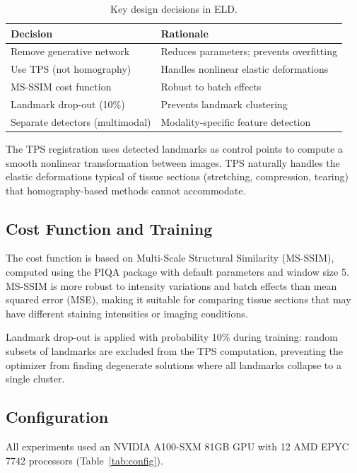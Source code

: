 \documentclass[11pt]{article}
\begin{document}
\begin{table}[h]
\centering
\caption{Key design decisions in ELD.}
\label{tab:design}
\begin{tabular}{ll}
\toprule
Decision & Rationale \\
\midrule
Remove generative network & Reduces parameters; prevents overfitting \\
Use TPS (not homography) & Handles nonlinear elastic deformations \\
MS-SSIM cost function & Robust to batch effects \\
Landmark drop-out (10\%) & Prevents landmark clustering \\
Separate detectors (multimodal) & Modality-specific feature detection \\
\bottomrule
\end{tabular}
\end{table}

The TPS registration uses detected landmarks as control points to compute a smooth nonlinear transformation between images. TPS naturally handles the elastic deformations typical of tissue sections (stretching, compression, tearing) that homography-based methods cannot accommodate.

\subsection{Cost Function and Training}

The cost function is based on Multi-Scale Structural Similarity (MS-SSIM), computed using the PIQA package with default parameters and window size 5. MS-SSIM is more robust to intensity variations and batch effects than mean squared error (MSE), making it suitable for comparing tissue sections that may have different staining intensities or imaging conditions.

Landmark drop-out is applied with probability 10\% during training: random subsets of landmarks are excluded from the TPS computation, preventing the optimizer from finding degenerate solutions where all landmarks collapse to a single cluster.

\subsection{Configuration}

All experiments used an NVIDIA A100-SXM 81GB GPU with 12 AMD EPYC 7742 processors (Table~\ref{tab:config}).
\end{document}
